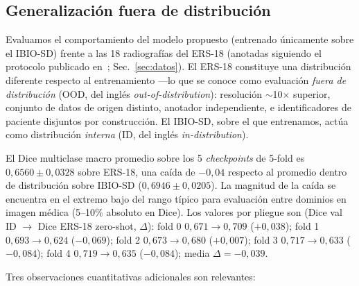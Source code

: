 \documentclass[conference]{IEEEtran}
\begin{document}
\subsection{Generalización fuera de distribución}
\label{sec:ood}

Evaluamos el comportamiento del modelo propuesto (entrenado únicamente sobre el IBIO-SD) frente a las 18 radiografías del ERS-18 (anotadas siguiendo el protocolo publicado en~\cite{ers18_protocol}; Sec.~\ref{sec:datos}). El ERS-18 constituye una distribución diferente respecto al entrenamiento ---lo que se conoce como evaluación \emph{fuera de distribución} (OOD, del inglés \emph{out-of-distribution}): resolución $\sim$10$\times$ superior, conjunto de datos de origen distinto, anotador independiente, e identificadores de paciente disjuntos por construcción. El IBIO-SD, sobre el que entrenamos, actúa como distribución \emph{interna} (ID, del inglés \emph{in-distribution}).

El Dice multiclase macro promedio sobre los 5 \emph{checkpoints} de 5-fold es $0{,}6560 \pm 0{,}0328$ sobre ERS-18, una caída de $-0{,}04$ respecto al promedio dentro de distribución sobre IBIO-SD ($0{,}6946 \pm 0{,}0205$). La magnitud de la caída se encuentra en el extremo bajo del rango típico para evaluación entre dominios en imagen médica (5--10\% absoluto en Dice). Los valores por pliegue son (Dice val ID $\rightarrow$ Dice ERS-18 zero-shot, $\Delta$): fold 0 $0{,}671 \rightarrow 0{,}709$ ($+0{,}038$); fold 1 $0{,}693 \rightarrow 0{,}624$ ($-0{,}069$); fold 2 $0{,}673 \rightarrow 0{,}680$ ($+0{,}007$); fold 3 $0{,}717 \rightarrow 0{,}633$ ($-0{,}084$); fold 4 $0{,}719 \rightarrow 0{,}635$ ($-0{,}084$); media $\Delta = -0{,}039$.

Tres observaciones cuantitativas adicionales son relevantes:
\end{document}
